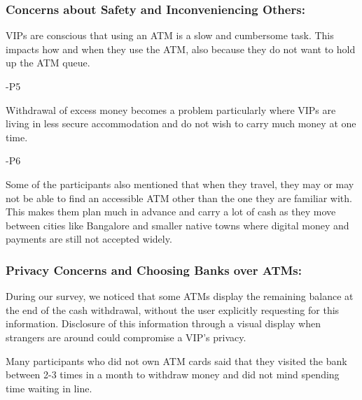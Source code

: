 \subsubsection*{\textbf{Concerns about Safety and Inconveniencing Others: }}
\label{sssec:safetyconcerns}

VIPs are conscious that using an ATM is a slow and cumbersome task. This impacts how and when they use the ATM, also because they do not want to hold up the ATM queue.

\textcolor{quotegray}{ -P5}

Withdrawal of excess money becomes a problem particularly where VIPs are living in less secure accommodation and do not wish to carry much money at one time.

\textcolor{quotegray}{ -P6}

Some of the participants also mentioned that when they travel, they may or may not be able to find an accessible ATM other than the one they are familiar with. This makes them plan much in advance and carry a lot of cash as they move between cities like Bangalore and smaller native towns where digital money and payments are still not accepted widely.

\subsubsection*{\textbf{Privacy Concerns and Choosing Banks over ATMs: }}
\label{sssec:privacyconcerns}

During our survey, we noticed that some ATMs display the remaining balance at the end of the cash withdrawal, without the user explicitly requesting for this information. Disclosure of this information through a visual display when strangers are around could compromise a VIP's privacy.  

Many participants who did not own ATM cards said that they visited the bank between 2-3 times in a month to withdraw money and did not mind spending time waiting in line.

